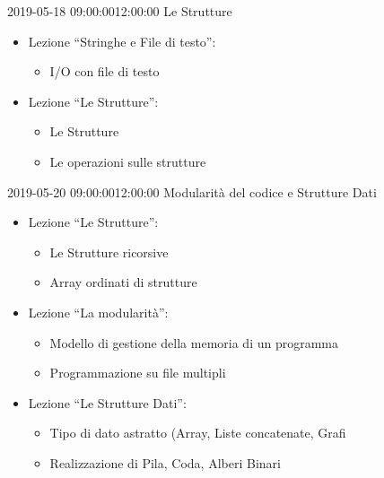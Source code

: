 \documentclass[twoside, symmetric]{tufte-book}
\begin{document}
\begin{lezione}
	{2019-05-18}
	{09:00:00}{12:00:00}
	{Le Strutture}

	\begin{itemize}
		\item Lezione ``Stringhe e File di testo'':
		\begin{itemize}
			\item I/O con file di testo
		\end{itemize}

		\item Lezione ``Le Strutture'':
		\begin{itemize}
			\item Le Strutture
			\item Le operazioni sulle strutture
		\end{itemize}
	\end{itemize}

\end{lezione}

\begin{lezione}
	{2019-05-20}
	{09:00:00}{12:00:00}
	{Modularità del codice e Strutture Dati}

	\begin{itemize}
		\item Lezione ``Le Strutture'':
		\begin{itemize}
			\item Le Strutture ricorsive
			\item Array ordinati di strutture
		\end{itemize}
		\item Lezione ``La modularità'':
		\begin{itemize}
			\item Modello di gestione della memoria di un programma
			\item Programmazione su file multipli
		\end{itemize}
		\item Lezione ``Le Strutture Dati'':
		\begin{itemize}
			\item Tipo di dato astratto (Array, Liste concatenate, Grafi
			\item Realizzazione di Pila, Coda, Alberi Binari
		\end{itemize}
	\end{itemize}

\end{lezione}
\end{document}
